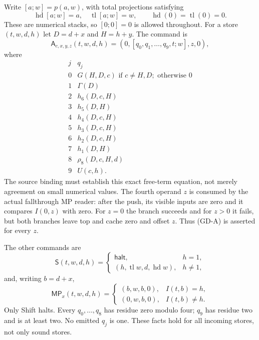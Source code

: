 Write $[a;w]=p(a,w)$, with total projections satisfying
\[
 \operatorname{hd}[a;w]=a,\quad\operatorname{tl}[a;w]=w,
 \qquad\operatorname{hd}(0)=\operatorname{tl}(0)=0.
\]
These are numerical stacks, so $[0;0]=0$ is allowed throughout.
For a store $(t,w,d,h)$ let $D=d+x$ and $H=h+y$. The command is
\begin{equation}
 \mathsf A_{c,x,y,z}(t,w,d,h)
       =(0,[q_0,q_1,\ldots,q_9,t;w],z,0),                 \tag{GD-A}
\end{equation}
where
\[
\begin{array}{c|l}
j&q_j\\\hline
0&G(H,D,c)\text{ if }c\ne H,D;\text{ otherwise }0\\
1&\Gamma(D)\\
2&h_6(D,c,H)\\
3&h_5(D,H)\\
4&h_4(D,c,H)\\
5&h_3(D,c,H)\\
6&h_2(D,c,H)\\
7&h_1(D,H)\\
8&\rho_8(D,c,H,d)\\
9&U(c,h).
\end{array}
\]
The source binding must establish this exact free-term equation, not
merely agreement on small numerical values. The fourth operand $z$ is
consumed by the actual fallthrough MP reader: after the push, its visible
inputs are zero and it compares $I(0,z)$ with zero. For $z=0$ the branch
succeeds and for $z>0$ it fails, but both branches leave top and cache
zero and offset $z$. Thus (GD-A) is asserted for every $z$.

The other commands are
\begin{equation}
 \mathsf S(t,w,d,h)=
 \begin{cases}
  \mathsf{halt},&h=1,\\
  (h,\operatorname{tl}w,d,\operatorname{hd}w),&h\ne1,
 \end{cases}                                               \tag{GD-S}
\end{equation}
and, writing $b=d+x$,
\begin{equation}
 \mathsf{MP}_x(t,w,d,h)=
 \begin{cases}
  (b,w,b,0),&I(t,b)=h,\\
  (0,w,b,0),&I(t,b)\ne h.
 \end{cases}                                               \tag{GD-M}
\end{equation}
Only Shift halts. Every $q_0,\ldots,q_8$ has residue zero modulo four;
$q_9$ has residue two and is at least two. No emitted $q_j$ is one.
These facts hold for all incoming stores, not only sound stores.

